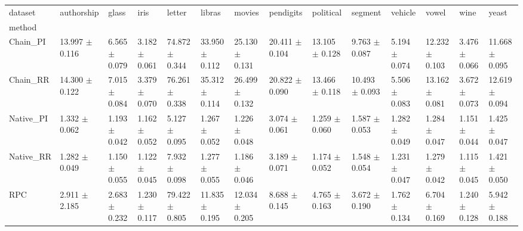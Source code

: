 \begin{tabular}{llllllllllllll}
\toprule
dataset &            authorship &                glass &                 iris &                letter &                libras &                movies &             pendigits &             political &               segment &              vehicle &                 vowel &                 wine &                 yeast \\
method    &                       &                      &                      &                       &                       &                       &                       &                       &                       &                      &                       &                      &                       \\
\midrule
Chain_PI  &  13.997 $ \pm $ 0.116 &  6.565 $ \pm $ 0.079 &  3.182 $ \pm $ 0.061 &  74.872 $ \pm $ 0.344 &  33.950 $ \pm $ 0.112 &  25.130 $ \pm $ 0.131 &  20.411 $ \pm $ 0.104 &  13.105 $ \pm $ 0.128 &   9.763 $ \pm $ 0.087 &  5.194 $ \pm $ 0.074 &  12.232 $ \pm $ 0.103 &  3.476 $ \pm $ 0.066 &  11.668 $ \pm $ 0.095 \\
Chain_RR  &  14.300 $ \pm $ 0.122 &  7.015 $ \pm $ 0.084 &  3.379 $ \pm $ 0.070 &  76.261 $ \pm $ 0.338 &  35.312 $ \pm $ 0.114 &  26.499 $ \pm $ 0.132 &  20.822 $ \pm $ 0.090 &  13.466 $ \pm $ 0.118 &  10.493 $ \pm $ 0.093 &  5.506 $ \pm $ 0.083 &  13.162 $ \pm $ 0.081 &  3.672 $ \pm $ 0.073 &  12.619 $ \pm $ 0.094 \\
Native_PI &   1.332 $ \pm $ 0.062 &  1.193 $ \pm $ 0.042 &  1.162 $ \pm $ 0.052 &   5.127 $ \pm $ 0.095 &   1.267 $ \pm $ 0.052 &   1.226 $ \pm $ 0.048 &   3.074 $ \pm $ 0.061 &   1.259 $ \pm $ 0.060 &   1.587 $ \pm $ 0.053 &  1.282 $ \pm $ 0.049 &   1.284 $ \pm $ 0.047 &  1.151 $ \pm $ 0.044 &   1.425 $ \pm $ 0.047 \\
Native_RR &   1.282 $ \pm $ 0.049 &  1.150 $ \pm $ 0.055 &  1.122 $ \pm $ 0.045 &   7.932 $ \pm $ 0.098 &   1.277 $ \pm $ 0.055 &   1.186 $ \pm $ 0.046 &   3.189 $ \pm $ 0.071 &   1.174 $ \pm $ 0.052 &   1.548 $ \pm $ 0.054 &  1.231 $ \pm $ 0.047 &   1.279 $ \pm $ 0.042 &  1.115 $ \pm $ 0.045 &   1.421 $ \pm $ 0.050 \\
RPC       &   2.911 $ \pm $ 2.185 &  2.683 $ \pm $ 0.232 &  1.230 $ \pm $ 0.117 &  79.422 $ \pm $ 0.805 &  11.835 $ \pm $ 0.195 &  12.034 $ \pm $ 0.205 &   8.688 $ \pm $ 0.145 &   4.765 $ \pm $ 0.163 &   3.672 $ \pm $ 0.190 &  1.762 $ \pm $ 0.134 &   6.704 $ \pm $ 0.169 &  1.240 $ \pm $ 0.128 &   5.942 $ \pm $ 0.188 \\

\end{tabular}
